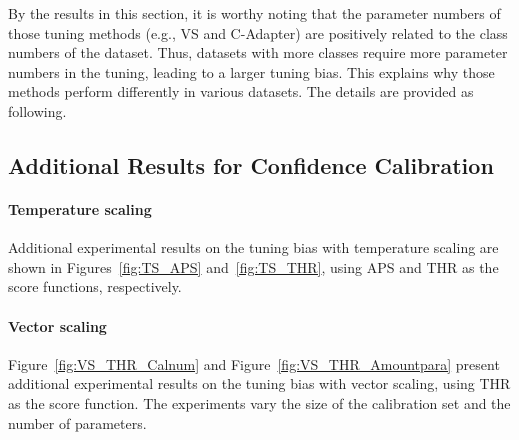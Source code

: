 \documentclass{article}
\newcommand{\1}{\mathbbm{1}}
\theoremstyle{plain}
\theoremstyle{definition}
\theoremstyle{remark}
\begin{document}
By the results in this section, it is worthy noting that the parameter numbers of those tuning methods (e.g., VS and C-Adapter) are positively related to the class numbers of the dataset. Thus, datasets with more classes require more parameter numbers in the tuning, leading to a larger tuning bias. This explains why those methods perform differently in various datasets. The details are provided as following.


\subsection{Additional Results for Confidence Calibration}

\paragraph{Temperature scaling} Additional experimental results on the tuning bias with temperature scaling are shown in Figures~\ref{fig:TS_APS} and~\ref{fig:TS_THR}, using APS and THR as the score functions, respectively.

\paragraph{Vector scaling} Figure~\ref{fig:VS_THR_Calnum} and Figure~\ref{fig:VS_THR_Amountpara} present additional experimental results on the tuning bias with vector scaling, using THR as the score function. The experiments vary the size of the calibration set and the number of parameters.
\end{document}
